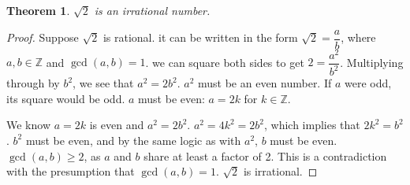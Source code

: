 \documentclass{article}
\newtheorem*{thm}{Theorem}
\begin{document}
\begin{thm}
$\sqrt{2}$ is an irrational number.
\end{thm}
\begin{proof}
Suppose $\sqrt{2}$ is rational. \Therefore it can be written in the form $\sqrt{2} = \dfrac{a}{b}$, where $a, b \in \mathbb{Z}$ and $\gcd(a,b) = 1$. \Therefore we can square both sides to get $2 = \dfrac{a^2}{b^2}$. Multiplying through by $b^2$, we see that $a^2 = 2b^2$. \Therefore $a^2$ must be an even number. If $a$ were odd, its square would be odd. \Therefore $a$ must be even: $a=2k$ for $k \in \mathbb{Z}$. 

We know $a=2k$ is even and $a^2 = 2b^2$. \Therefore $a^2 = 4k^2 = 2b^2$, which implies that $2k^2 = b^2$. \Therefore $b^2$ must be even, and by the same logic as with $a^2$, $b$ must be even. \Therefore $\gcd(a,b) \geq 2$, as $a$ and $b$ share at least a factor of 2. This is a contradiction with the presumption that $\gcd(a,b) = 1$. \Therefore $\sqrt{2}$ is irrational.
\end{proof}
\end{document}
